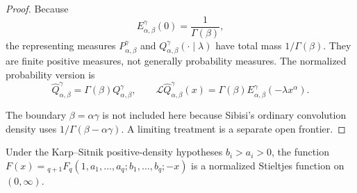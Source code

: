 \begin{proof}
Because
\[
E^\gamma_{\alpha,\beta}(0)=\frac1{\Gamma(\beta)},
\]
the representing measures \(P^\gamma_{\alpha,\beta}\) and \(Q^\gamma_{\alpha,\beta}(\cdot\mid\lambda)\) have total mass \(1/\Gamma(\beta)\). They are finite positive measures, not generally probability measures. The normalized probability version is
\[
\widehat Q^\gamma_{\alpha,\beta}=\Gamma(\beta)Q^\gamma_{\alpha,\beta},
\qquad
\mathcal L\widehat Q^\gamma_{\alpha,\beta}(x)
=\Gamma(\beta)E^\gamma_{\alpha,\beta}(-\lambda x^\alpha).
\]

The boundary \(\beta=\alpha\gamma\) is not included here because Sibisi's ordinary convolution density uses \(1/\Gamma(\beta-\alpha\gamma)\). A limiting treatment is a separate open frontier.
\end{proof}

\begin{lemma}
\label{res:ks-lemma1-stieltjes-normal-form}
Under the Karp--Sitnik positive-density hypotheses \(b_i>a_i>0\), the function \(F(x)={}_{q+1}F_q(1,a_1,\ldots,a_q;b_1,\ldots,b_q;-x)\) is a normalized Stieltjes function on \((0,\infty)\).
\end{lemma}
